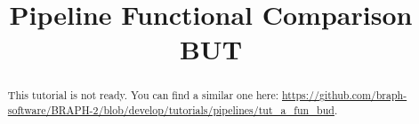 \documentclass[justified]{tufte-handout}
\title{Pipeline Functional Comparison BUT}
\begin{document}
\maketitle

\begin{abstract}
\noindent
This tutorial is not ready. You can find a similar one here: \url{https://github.com/braph-software/BRAPH-2/blob/develop/tutorials/pipelines/tut_a_fun_bud}.
\end{abstract}
\end{document}
